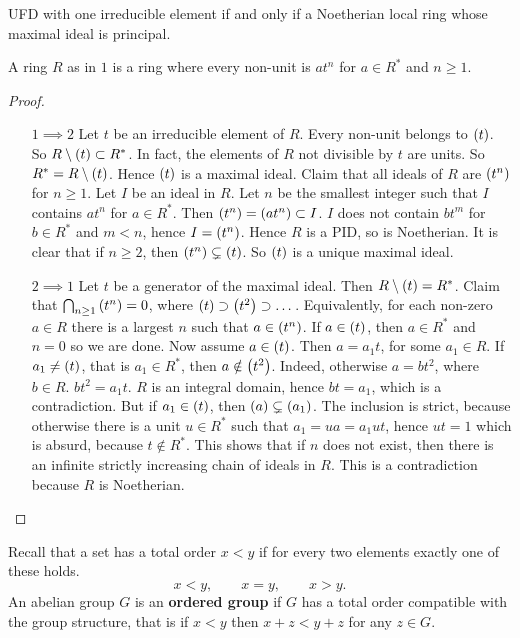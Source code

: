 \begin{theorem}
UFD with one irreducible element if and only if a Noetherian local ring whose maximal ideal is principal.
\end{theorem}

A ring $ R $ as in $ 1 $ is a ring where every non-unit is $ at^n $ for $ a \in R^* $ and $ n \ge 1 $.

\begin{proof}
\hfill
\begin{itemize}[leftmargin=0.5in]
\item[$ 1 \implies 2 $] Let $ t $ be an irreducible element of $ R $. Every non-unit belongs to $ \br{t} $. So $ R \setminus \br{t} \subset R^* $. In fact, the elements of $ R $ not divisible by $ t $ are units. So $ R^* = R \setminus \br{t} $. Hence $ \br{t} $ is a maximal ideal. Claim that all ideals of $ R $ are $ \br{t^n} $ for $ n \ge 1 $. Let $ I $ be an ideal in $ R $. Let $ n $ be the smallest integer such that $ I $ contains $ at^n $ for $ a \in R^* $. Then $ \br{t^n} = \br{at^n} \subset I $. $ I $ does not contain $ bt^m $ for $ b \in R^* $ and $ m < n $, hence $ I = \br{t^n} $. Hence $ R $ is a PID, so is Noetherian. It is clear that if $ n \ge 2 $, then $ \br{t^n} \subsetneq \br{t} $. So $ \br{t} $ is a unique maximal ideal.
\item[$ 2 \implies 1 $] Let $ t $ be a generator of the maximal ideal. Then $ R \setminus \br{t} = R^* $. Claim that $ \bigcap_{n \ge 1} \br{t^n} = 0 $, where $ \br{t} \supset \br{t^2} \supset \dots $. Equivalently, for each non-zero $ a \in R $ there is a largest $ n $ such that $ a \in \br{t^n} $. If $ a \in \br{t} $, then $ a \in R^* $ and $ n = 0 $ so we are done. Now assume $ a \in \br{t} $. Then $ a = a_1t $, for some $ a_1 \in R $. If $ a_1 \ne \br{t} $, that is $ a_1 \in R^* $, then $ a \notin \br{t^2} $. Indeed, otherwise $ a = bt^2 $, where $ b \in R $. $ bt^2 = a_1t $. $ R $ is an integral domain, hence $ bt = a_1 $, which is a contradiction. But if $ a_1 \in \br{t} $, then $ \br{a} \subsetneq \br{a_1} $. The inclusion is strict, because otherwise there is a unit $ u \in R^* $ such that $ a_1 = ua = a_1ut $, hence $ ut = 1 $ which is absurd, because $ t \notin R^* $. This shows that if $ n $ does not exist, then there is an infinite strictly increasing chain of ideals in $ R $. This is a contradiction because $ R $ is Noetherian.
\end{itemize}
\end{proof}

Recall that a set has a total order $ x < y $ if for every two elements exactly one of these holds.
$$ x < y, \qquad x = y, \qquad x > y. $$
An abelian group $ G $ is an \textbf{ordered group} if $ G $ has a total order compatible with the group structure, that is if $ x < y $ then $ x + z < y + z $ for any $ z \in G $.

